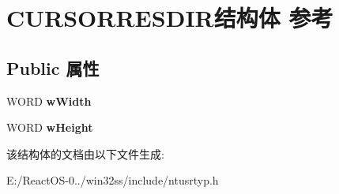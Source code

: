 \hypertarget{struct_c_u_r_s_o_r_r_e_s_d_i_r}{}\section{C\+U\+R\+S\+O\+R\+R\+E\+S\+D\+I\+R结构体 参考}
\label{struct_c_u_r_s_o_r_r_e_s_d_i_r}
\subsection*{Public 属性}
\begin{DoxyCompactItemize}
\item 
\mbox{\label{struct_c_u_r_s_o_r_r_e_s_d_i_r_ae28ba42f763b1d1ffd1b0d370d8671d9}} 
W\+O\+RD {\bfseries w\+Width}
\item 
\mbox{\label{struct_c_u_r_s_o_r_r_e_s_d_i_r_af3171e423e81732daea09499f414a454}} 
W\+O\+RD {\bfseries w\+Height}
\end{DoxyCompactItemize}


该结构体的文档由以下文件生成\+:\begin{DoxyCompactItemize}
\item 
E\+:/\+React\+O\+S-\/0../win32ss/include/ntusrtyp.\+h\end{DoxyCompactItemize}
